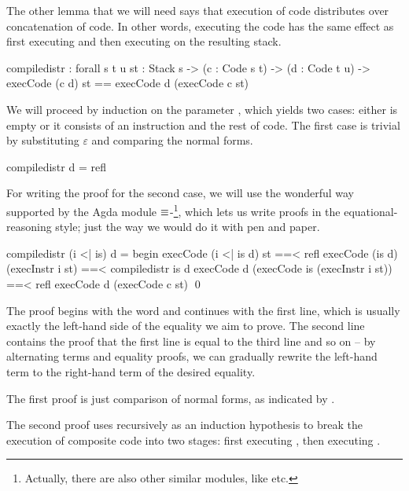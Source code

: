 The other lemma that we will need says that execution of code distributes over
concatenation of code. In other words, executing the code  has the same effect as first executing  and then executing
 on the resulting stack.

\label{sec:cor-compile-distr}\begin{code}
  compile\-distr : forall {s t u} {st : Stack s}
    -> (c : Code s t) -> (d : Code t u)
    -> execCode (c \app d) st == execCode d (execCode c st)
\end{code}

\noindent We will proceed by induction on the parameter , which yields
two cases: either  is empty or it consists of an instruction and the
rest of code. The first case is trivial by substituting $\varepsilon$ and
comparing the normal forms.

\begin{code}
  compile\-distr \nil d = refl
\end{code}

\noindent For writing the proof for the second case, we will use the wonderful
way supported by the Agda module $\mathsf{\equiv}$-\footnote{Actually,
there are also other similar modules, like  etc.}, which
lets us write proofs in the equational-reasoning style; just the way we would
do it with pen and paper.

\begin{code}
  compile\-distr (i <| is) d = begin
    execCode (i <| is \app d) st
      ==< refl \>
    execCode (is \app d) (execInstr i st)
      ==< compile\-distr is d \>
    execCode d (execCode is (execInstr i st))
      ==< refl \>
    execCode d (execCode c st)
    \qed
\end{code}

\noindent The proof begins with the word  and continues with the
first line, which is usually exactly the left-hand side of the equality we aim
to prove.  The second line contains the proof that the first line is equal to
the third line and so on -- by alternating terms and equality proofs, we can
gradually rewrite the left-hand term to the right-hand term of the desired
equality.

The first proof is just comparison of normal forms, as indicated by
.

The second proof uses  recursively as an induction
hypothesis to break the execution of composite code into two stages: first
executing , then executing .


